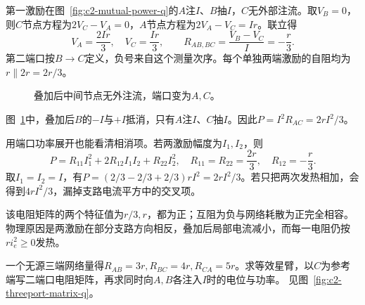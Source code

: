 \begin{solution}
第一激励在图~\ref{fig:c2-mutual-power-q}的$A$注$I$、$B$抽$I$，$C$无外部注流。取$V_B=0$，则$C$节点方程为$2V_C-V_A=0$，$A$节点方程为$2V_A-V_C=Ir$。联立得
\[
 V_A=\frac{2Ir}3,\quad V_C=\frac{Ir}3,
 \qquad\boxed{R_{AB,BC}=\frac{V_B-V_C}I=-\frac r3}.
\]
第二端口按$B\to C$定义，负号来自这个测量次序。每个单独两端激励的自阻均为$r\parallel2r=2r/3$。
\begin{figure}[H]\centering
{}
\caption{叠加后中间节点无外注流，端口变为$A,C$。}\label{fig:c2-mutual-power-s}
\end{figure}
图~\ref{fig:c2-mutual-power-s}中，叠加后$B$的$-I$与$+I$抵消，只有$A$注$I$、$C$抽$I$。因此$P=I^2R_{AC}=2rI^2/3$。

用端口功率展开也能看清相消项。若两激励幅度为$I_1,I_2$，则
\[
 P=R_{11}I_1^2+2R_{12}I_1I_2+R_{22}I_2^2,
 \quad R_{11}=R_{22}=\frac{2r}3,\quad R_{12}=-\frac r3.
\]
取$I_1=I_2=I$，有$P=(2/3-2/3+2/3)rI^2=2rI^2/3$。若只把两次发热相加，会得到$4rI^2/3$，漏掉支路电流平方中的交叉项。

该电阻矩阵的两个特征值为$r/3,r$，都为正；互阻为负与网络耗散为正完全相容。物理原因是两激励在部分支路方向相反，叠加后局部电流减小，而每一电阻仍按$r i_e^2\ge0$发热。
\end{solution}

\begin{example}[由三端测量恢复星形参数]\label{ex:c2-threeport-matrix}
一个无源三端网络量得$R_{AB}=3r,R_{BC}=4r,R_{CA}=5r$。求等效星臂，以$C$为参考端写二端口电阻矩阵，再求同时向$A,B$各注入$I$时的电位与功率。 见图~\ref{fig:c2-threeport-matrix-q}。
\end{example}

